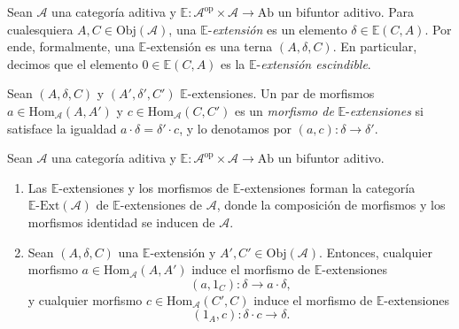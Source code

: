 \documentclass[tesis]{subfiles}
\begin{document}
\begin{Def}\cite[Definition 2.1]{NakaokaPalu}\label{Def: E-extensión}
    Sean $\mathscr{A}$ una categoría aditiva y $\mathbb{E}:\mathscr{A}^\text{op}\times\mathscr{A}\to \text{Ab}$ un bifuntor aditivo. Para cualesquiera $A,C\in\text{Obj}(\mathscr{A})$, una $\mathbb{E}$-\emph{extensión} es un elemento $\delta\in\mathbb{E}(C,A)$. Por ende, formalmente, una $\mathbb{E}$-extensión es una terna $(A,\delta,C)$. En particular, decimos que el elemento $0\in\mathbb{E}(C,A)$ es la $\mathbb{E}$-\emph{extensión escindible}.
\end{Def}

\begin{Def}\cite[Definition 2.3]{NakaokaPalu}\label{Def: Morfismo de E-extensiones}
    Sean $(A,\delta,C)$ y $(A',\delta',C')$ $\mathbb{E}$-extensiones. Un par de morfismos $a\in\text{Hom}_\mathscr{A}(A,A')$ y $c\in\text{Hom}_\mathscr{A}(C,C')$ es un \emph{morfismo de} $\mathbb{E}$-\emph{extensiones} si satisface la igualdad $a\cdot\delta = \delta'\cdot c$, y lo denotamos por $(a,c):\delta\to \delta'$.
\end{Def}

\begin{Obs}\cite[Remark 2.4]{NakaokaPalu}\label{Observaciones de morfismos de E-extensiones}
    Sean $\mathscr{A}$ una categoría aditiva y $\mathbb{E}:\mathscr{A}^\text{op}\times\mathscr{A}\to \text{Ab}$ un bifuntor aditivo.

    \begin{enumerate}[label=(\arabic*)]
    
        \item Las $\mathbb{E}$-extensiones y los morfismos de $\mathbb{E}$-extensiones forman la categoría $\mathbb{E}\text{-Ext}(\mathscr{A})$ de $\mathbb{E}$-extensiones de $\mathscr{A}$, donde la composición de morfismos y los morfismos identidad se inducen de $\mathscr{A}$.

        \item Sean  $(A,\delta,C)$ una $\mathbb{E}$-extensión y $A',C'\in\text{Obj}(\mathscr{A})$. Entonces, cualquier morfismo $a\in\text{Hom}_\mathscr{A}(A,A')$ induce el morfismo de $\mathbb{E}$-extensiones
            \[
                (a,1_{C}):\delta\to a\cdot\delta,
            \] 
            y cualquier morfismo $c\in\text{Hom}_\mathscr{A}(C',C)$ induce el morfismo de $\mathbb{E}$-extensiones
            \[
                (1_{A},c):\delta\cdot c\to \delta.
            \] 
    \end{enumerate}
\end{Obs}
\end{document}
